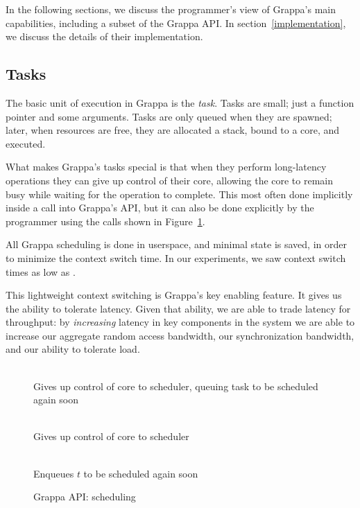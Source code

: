 In the following sections, we discuss the programmer's view of
Grappa's main capabilities, including a subset of the Grappa API. In
section~\ref{implementation}, we discuss the details of their
implementation.


\subsection{Tasks}


The basic unit of execution in Grappa is the {\em task}. Tasks are
small; just a function pointer and some arguments. Tasks are only
queued when they are spawned; later, when resources are free, they are
allocated a stack, bound to a core, and executed.

What makes Grappa's tasks special is that when they perform
long-latency operations they can give up control of their core,
allowing the core to remain busy while waiting for the operation to
complete. This most often done implicitly inside a call into Grappa's
API, but it can also be done explicitly by the programmer using the
calls shown in Figure~\ref{fig:scheduling}. 

All Grappa scheduling is done in userspace, and minimal state is
saved, in order to minimize the context switch time. In our
experiments, we saw context switch times as low as .

This lightweight context switching is Grappa's key enabling
feature. It gives us the ability to tolerate latency. Given that
ability, we are able to trade latency for throughput: by {\em
  increasing} latency in key components in the system we are able to
increase our aggregate random access bandwidth, our synchronization
bandwidth, and our ability to tolerate load.

\begin{figure}[htbp]
  \begin{center}
    \begin{description}\small
    \item[ \texttt{ yield() } ] \hfill \\
      Gives up control of core to scheduler, queuing task to be scheduled again soon
    \item[ \texttt{ suspend() } ] \hfill \\
      Gives up control of core to scheduler
    \item[ \texttt{ wake( task * $t$ ) } ] \hfill \\
      Enqueues $t$ to be scheduled again soon
    \end{description}
    \begin{minipage}{0.95\columnwidth}
      \caption{\label{fig:scheduling} Grappa API: scheduling} %
    \end{minipage}
  \end{center}
\end{figure}


